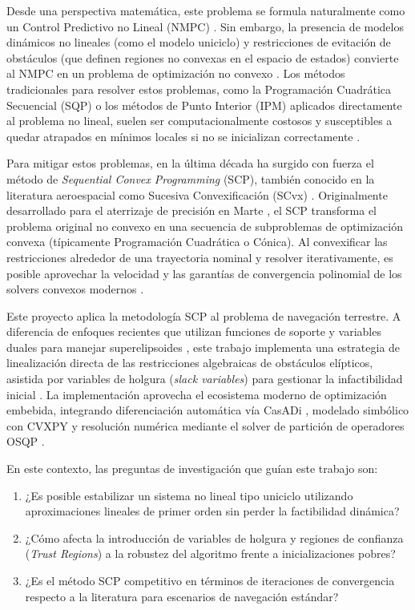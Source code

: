 \documentclass[conference]{IEEEtran}
\begin{document}
Desde una perspectiva matemática, este problema se formula naturalmente como un Control Predictivo no Lineal (NMPC) \cite{grune_nmpc}. Sin embargo, la presencia de modelos dinámicos no lineales (como el modelo uniciclo) y restricciones de evitación de obstáculos (que definen regiones no convexas en el espacio de estados) convierte al NMPC en un problema de optimización no convexo \cite{boyd_convex}. Los métodos tradicionales para resolver estos problemas, como la Programación Cuadrática Secuencial (SQP) o los métodos de Punto Interior (IPM) aplicados directamente al problema no lineal, suelen ser computacionalmente costosos y susceptibles a quedar atrapados en mínimos locales si no se inicializan correctamente \cite{diehl_nmpc}.

Para mitigar estos problemas, en la última década ha surgido con fuerza el método de \textit{Sequential Convex Programming} (SCP), también conocido en la literatura aeroespacial como Sucesiva Convexificación (SCvx) \cite{scvx_mao}. Originalmente desarrollado para el aterrizaje de precisión en Marte \cite{szmuk_landing, scvx_survey}, el SCP transforma el problema original no convexo en una secuencia de subproblemas de optimización convexa (típicamente Programación Cuadrática o Cónica). Al convexificar las restricciones alrededor de una trayectoria nominal y resolver iterativamente, es posible aprovechar la velocidad y las garantías de convergencia polinomial de los solvers convexos modernos \cite{boyd_convex}.

Este proyecto aplica la metodología SCP al problema de navegación terrestre. A diferencia de enfoques recientes que utilizan funciones de soporte y variables duales para manejar superelipsoides \cite{moran_nmpc}, este trabajo implementa una estrategia de linealización directa de las restricciones algebraicas de obstáculos elípticos, asistida por variables de holgura (\textit{slack variables}) para gestionar la infactibilidad inicial \cite{scvx_mao}. La implementación aprovecha el ecosistema moderno de optimización embebida, integrando diferenciación automática vía CasADi \cite{casadi}, modelado simbólico con CVXPY \cite{cvxpy} y resolución numérica mediante el solver de partición de operadores OSQP \cite{osqp}.

En este contexto, las preguntas de investigación que guían este trabajo son:
\begin{enumerate}
    \item ¿Es posible estabilizar un sistema no lineal tipo uniciclo utilizando aproximaciones lineales de primer orden sin perder la factibilidad dinámica?
    \item ¿Cómo afecta la introducción de variables de holgura y regiones de confianza (\textit{Trust Regions}) a la robustez del algoritmo frente a inicializaciones pobres?
    \item ¿Es el método SCP competitivo en términos de iteraciones de convergencia respecto a la literatura para escenarios de navegación estándar?
\end{enumerate}
\end{document}
